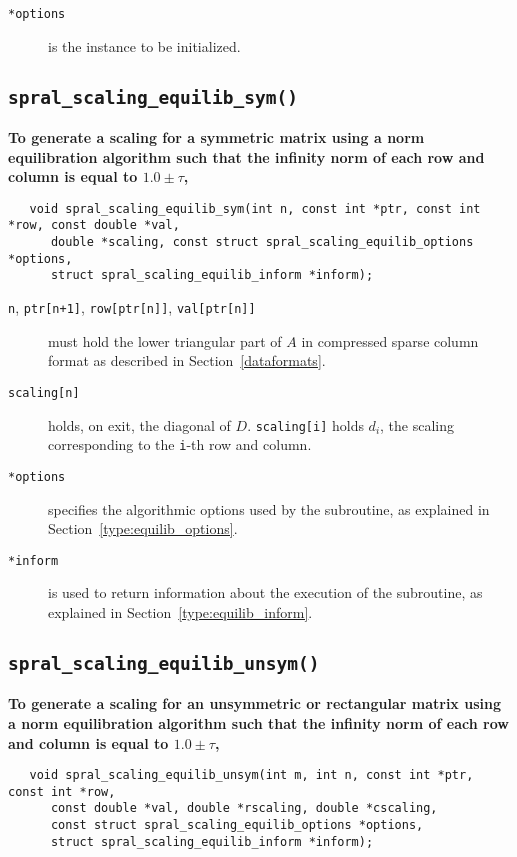 \begin{description}
   \item[\texttt{*options}] is the instance to be initialized.
\end{description}

\subsection{\texttt{spral\_scaling\_equilib\_sym()}}

\textbf{\noindent
   To generate a scaling for a symmetric matrix using a norm equilibration algorithm such that the infinity norm of each row and column is equal to $1.0\pm\tau$,
}
\vspace*{-0.1cm}
\begin{verbatim}
   void spral_scaling_equilib_sym(int n, const int *ptr, const int *row, const double *val,
      double *scaling, const struct spral_scaling_equilib_options *options,
      struct spral_scaling_equilib_inform *inform);
\end{verbatim}

\begin{description}

\item[\texttt{n}, \texttt{ptr[n+1]}, \texttt{row[ptr[n]]}, \texttt{val[ptr[n]]}] must hold the lower triangular part of $A$ in compressed sparse column format as described in Section~\ref{dataformats}.

\item[\texttt{scaling[n]}] holds, on exit, the diagonal of $D$.
\texttt{scaling[i]} holds $d_i$, the scaling corresponding to the
\texttt{i}-th row and column.

\item[\texttt{*options}] specifies the algorithmic options used by the subroutine, as explained in Section~\ref{type:equilib_options}.

\item[\texttt{*inform}] is used to return information about the execution of the subroutine, as explained in Section~\ref{type:equilib_inform}.


\end{description}


\subsection{\texttt{spral\_scaling\_equilib\_unsym()}}

\textbf{\noindent
   To generate a scaling for an unsymmetric or rectangular matrix using a norm equilibration algorithm such that the infinity norm of each row and column is equal to $1.0\pm\tau$,
}
\vspace*{-0.1cm}
\begin{verbatim}
   void spral_scaling_equilib_unsym(int m, int n, const int *ptr, const int *row,
      const double *val, double *rscaling, double *cscaling,
      const struct spral_scaling_equilib_options *options,
      struct spral_scaling_equilib_inform *inform);
\end{verbatim}

